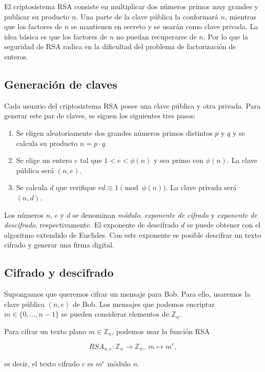 El criptosistema RSA consiste en multiplicar dos números primos muy grandes y publicar su producto $n$. Una parte de la clave pública la conformará $n$, mientras que los factores de $n$ se mantienen en secreto y se usarán como clave privada. La idea básica es que los factores de $n$ no puedan recuperarse de $n$. Por lo que la seguridad de RSA radica en la dificultad del problema de factorización de enteros.

\subsection{Generación de claves}

Cada usuario del criptosistema RSA posee una clave pública y otra privada. Para generar este par de claves, se siguen los siguientes tres pasos:

\begin{enumerate}
    \item Se eligen aleatoriamente dos grandes números primos distintos $p$ y $q$ y se calcula su producto $n = p \cdot q$.
    \item Se elige un entero $e$ tal que $1 < e < \phi(n)$ y sea primo con $\phi(n)$. La clave pública será $(n, e)$.
    \item Se calcula $d$ que verifique $ed \equiv 1 \pmod{\phi(n)}$. La clave privada será $(n, d)$.
\end{enumerate}

Los números $n$, $e$ y $d$ se denominan \emph{módulo}, \emph{exponente de cifrado} y \emph{exponente de descifrado}, respectivamente. El exponente de descifrado $d$ se puede obtener con el algoritmo extendido de Euclides. Con este exponente es posible descifrar un texto cifrado y generar una firma digital.

\subsection{Cifrado y descifrado}

Supongamos que queremos cifrar un mensaje para Bob. Para ello, usaremos la clave pública $(n, e)$ de Bob. Los mensajes que podemos encriptar $m \in \{ 0, ..., n-1 \}$ se pueden considerar elementos de $\mathbb{Z}_n$.

Para cifrar un texto plano $m \in \mathbb{Z}_n$, podemos usar la función RSA

$$RSA_{n, e} : \mathbb{Z}_n \longrightarrow \mathbb{Z}_n, \; m \longmapsto m^e,$$

es decir, el texto cifrado $c$ es $m^e$ módulo $n$.

